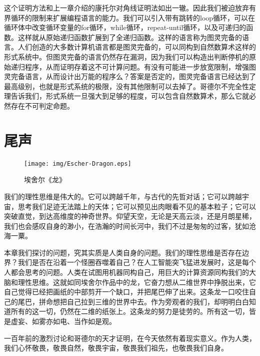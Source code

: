 \documentclass{article}
\begin{document}
这个证明方法和上一章介绍的康托尔对角线证明法如出一辙。因此我们被迫放弃有界循环的限制来扩展编程语言的能力。我们可以引入带有跳转的loop循环，可以在循环体中改变循环变量的for循环，while循环，repeat-until循环，以及可递归的函数。这样就从原始递归函数扩展到了全递归函数。这样的语言称为图灵完备的语言。人们创造的大多数计算机语言都是图灵完备的，可以同构到自然数算术这样的形式系统中。但图灵完备的语言仍然存在漏洞，因为我们可以构造出判断停机的原始递归程序，从而证明存着这不可计算问题。有没有可能进一步放宽限制，增强图灵完备语言，从而设计出万能的程序么？答案是否定的，图灵完备语言已经达到了最高级别，也就是形式系统的极限，没有其他限制可以去掉了。哥德尔不完全性定理告诉我们，形式系统一旦强大到足够的程度，可以包含自然数算术，那么它就必然存在不可判定命题。

\section{尾声}

\begin{wrapfigure}{R}{0.6\textwidth}
 \centering
 \texttt{[image: img/Escher-Dragon.eps]}
 \caption{埃舍尔《龙》}
 \label{fig:Escher-Dragon}
\end{wrapfigure}

我们的理性思维是伟大的。它可以跨越千年，与古代的先哲对话；它可以跨越宇宙，思考我们足迹无法踏上的天体；它可以预见出肉眼看不见的基本粒子；它可以突破直觉，到达高维度的神奇世界。仰望天空，无论是天高云淡，还是月朗星稀，我们也会感叹自身的渺小，在浩瀚的时间长河中，我们不过是匆匆的过客，犹如沧海一粟。

本章我们探讨的问题，究其实质是人类自身的问题。我们的理性思维是否存在边界？我们是否在沿着一个怪圈吞噬着自己？在人工智能突飞猛进发展时，这是每个人都会思考的问题。人类在试图用机器同构自己，用巨大的计算资源同构我们的大脑和理性思维。这就如同埃舍尔作品中的龙，它奋力想从二维世界中挣脱出来，它自己觉得已经把画纸的中部剪开一个缺口，并把尾巴伸了出来。这条龙一口咬住自己的尾巴，拼命想把自己拉到三维的世界中去。作为旁观者的我们，却明明白白知道所有的这一切，仍然在二维的纸张上。这条龙的努力是徒劳的。所有这一切，皆是虚妄、如雾亦如电、当作如是观。

一百年前的激烈讨论和哥德尔的天才证明，在今天依然有着现实意义。作为人类，我们心怀敬畏，敬畏自然，敬畏宇宙，敬畏我们祖先，也敬畏我们自身。
\end{document}
